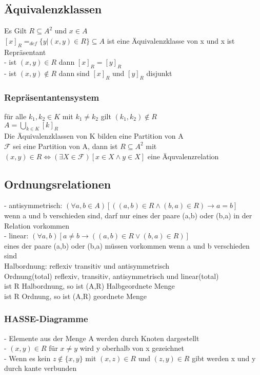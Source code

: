 \documentclass[a4paper]{scrartcl}
\begin{document}
\subsection{Äquivalenzklassen}
Es Gilt $R\subseteq A^2$ und $x\in A$\\
$[x]_R =_{def}\{y|(x,y)\in R\}\subseteq A$ ist eine Äquivalenzklasse von x und x ist Repräsentant\\
- ist $(x,y)\in R$ dann $[x]_R = [y]_R$\\
- ist $(x,y)\notin R$ dann sind $[x]_R$ und $[y]_R$ disjunkt\\

\subsubsection{Repräsentantensystem}
für alle $k_1, k_2 \in K$ mit $k_1 \neq k_2$ gilt $(k_1,k_2)\notin R$\\
$A = \bigcup \limits_{k\in K} [k]_R$\\
Die Äquivalenzklassen von K bilden eine Partition von A\\
$\mathcal{F}$ sei eine Partition von A, dann ist $R \subseteq A^2$ mit $(x,y)\in R \Leftrightarrow (\exists X \in \mathcal{F})[x\in X \wedge y\in X]$ eine Äquvalenzrelation\\

\subsection{Ordnungsrelationen}
- antisymmetrisch: $(\forall a,b \in A)[((a,b)\in R \wedge (b,a) \in R) \to a = b]$\\
  wenn a und b verschieden sind, darf nur eines der paare (a,b) oder (b,a) in der Relation vorkommen\\
- linear: $(\forall a,b)[a \neq b \to ((a,b)\in R \vee (b,a) \in R)]$\\
  eines der paare (a,b) oder (b,a) müssen vorkommen wenn a und b verschieden sind\\
  
 Halbordnung: reflexiv transitiv und antisymmetrisch\\
 Ordnung(total) reflexiv, transitiv, antisymmetrisch und linear(total)\\
 ist R Halbordnung, so ist (A,R) Halbgeordnete Menge\\
 ist R Ordnung, so ist (A,R) geordnete Menge\\
 
 \subsubsection{HASSE-Diagramme}
 - Elemente aus der Menge A werden durch Knoten dargestellt\\
 - $(x,y)\in R$ für $x \neq y$ wird y oberhalb von x gezeichnet\\
 - Wenn es kein $z\notin \{x,y\}$ mit $(x,z)\in R$ und $(z,y)\in R$ gibt werden x und y durch kante verbunden\\
 
\end{document}
